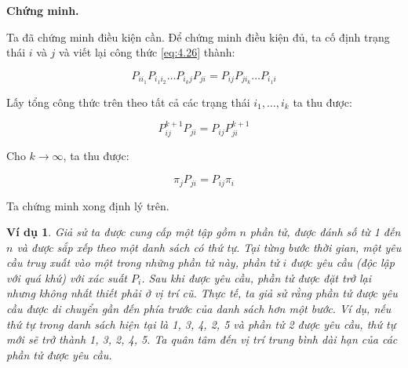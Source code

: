 \documentclass[14pt, a4paper]{article}
\numberwithin{equation}{section}
\numberwithin{figure}{section}
\theoremstyle{sltheorem}
\newtheorem{vd}{Ví dụ}
\theoremstyle{soltheorem}
\numberwithin{dl}{section}
\numberwithin{md}{section}
\numberwithin{vd}{section}
\begin{document}
    \textbf{Chứng minh.}

    Ta đã chứng minh điều kiện cần.
    Để chứng minh điều kiện đủ, ta cố định trạng thái $i$ và $j$ và viết lại công thức \ref{eq:4.26} thành:

    \begin{equation*}
        P_{ii_1} P_{i_1 i_2} \dots P_{i_k j} P_{ji} = P_{ij} P_{j i_k} \dots P_{i_1 i}
    \end{equation*}

    Lấy tổng công thức trên theo tất cả các trạng thái $i_1, \dots, i_k$ ta thu được:

    \begin{equation*}
        P_{ij}^{k+1} P_{ji} = P_{ij} P_{ji}^{k+1}
    \end{equation*}

    Cho $k \rightarrow \infty$, ta thu được:

    \begin{equation*}
        \pi_j P_{ji} = P_{ij} \pi_i
    \end{equation*}

    Ta chứng minh xong định lý trên.

    \begin{vd}
        Giả sử ta được cung cấp một tập gồm $n$ phần tử, được đánh số từ 1 đến $n$ và được sắp xếp theo một danh sách có thứ tự.
        Tại từng bước thời gian, một yêu cầu truy xuất vào một trong những phần tử này, phần tử $i$ được yêu cầu (độc lập với quá khứ) với xác suất $P_i$.
        Sau khi được yêu cầu, phần tử được đặt trở lại nhưng không nhất thiết phải ở vị trí cũ.
        Thực tế, ta giả sử rằng phần tử được yêu cầu được di chuyển gần đến phía trước của danh sách hơn một bước.
        Ví dụ, nếu thứ tự trong danh sách hiện tại là 1, 3, 4, 2, 5 và phần tử 2 được yêu cầu, thứ tự mới sẽ trở thành 1, 3, 2, 4, 5.
        Ta quân tâm đến vị trí trung bình dài hạn của các phần tử được yêu cầu.
    \end{vd}
\end{document}
